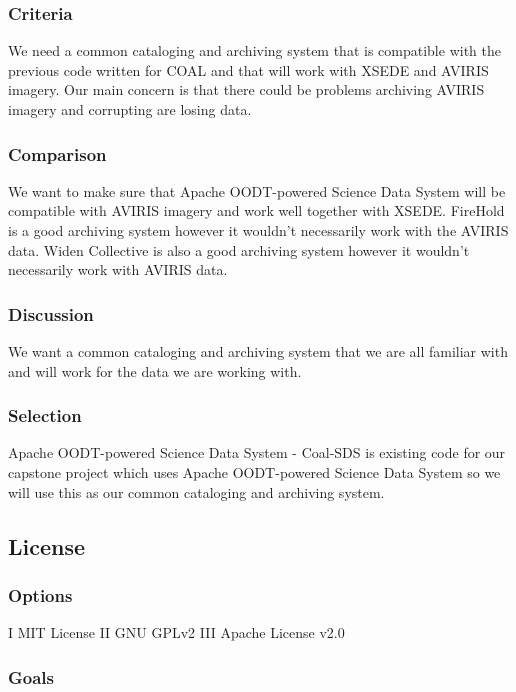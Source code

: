 \documentclass[10pt,draftclsnofoot,onecolumn,journal,compsoc]{IEEEtran}
\begin{document}
\subsubsection{Criteria}
We need a common cataloging and archiving system that is compatible with the previous code written for COAL and that will work with XSEDE and AVIRIS imagery. Our main concern is that there could be problems archiving AVIRIS imagery and corrupting are losing data.

\subsubsection{Comparison}
\noindent We want to make sure that Apache OODT-powered Science Data System will be compatible with AVIRIS imagery and work well together with XSEDE. FireHold is a good archiving system however it wouldn't necessarily work with the AVIRIS data. \cite{22} Widen Collective is also a good archiving system however it wouldn't necessarily work with AVIRIS data. \cite{23}

\subsubsection{Discussion}
\noindent We want a common cataloging and archiving system that we are all familiar with and will work for the data we are working with.

\subsubsection{Selection}
Apache OODT-powered Science Data System - Coal-SDS is existing code for our capstone project which uses Apache OODT-powered Science Data System so we will use this as our common cataloging and archiving system. \cite{21}

\subsection{License}

\subsubsection{Options}

\noindent I MIT License \newline
\noindent II GNU GPLv2 \newline
\noindent III Apache License v2.0

\subsubsection{Goals}
\end{document}

